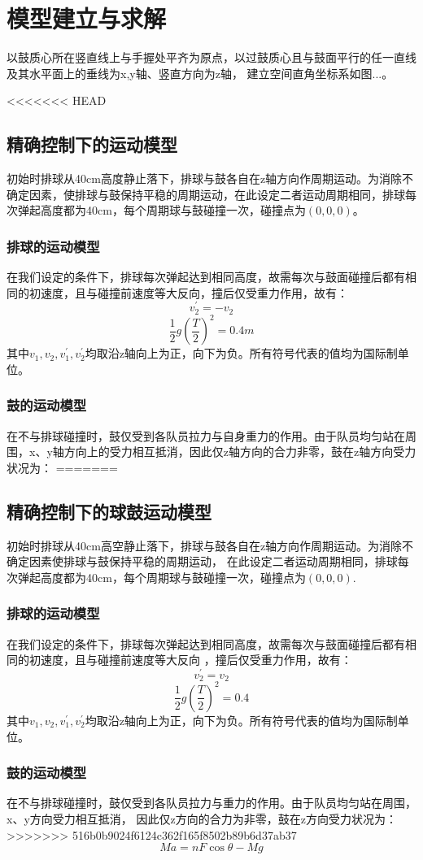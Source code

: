 \documentclass[withoutpreface,bwprint]{cumcmthesis} %
\begin{document}
\section{模型建立与求解}
以鼓质心所在竖直线上与手握处平齐为原点，以过鼓质心且与鼓面平行的任一直线及其水平面上的垂线为x,y轴、竖直方向为z轴，
建立空间直角坐标系如图...。

<<<<<<< HEAD
\subsection{精确控制下的运动模型}
初始时排球从40cm高度静止落下，排球与鼓各自在z轴方向作周期运动。为消除不确定因素，使排球与鼓保持平稳的周期运动，在此设定二者运动周期相同，排球每次弹起高度都为40cm，每个周期球与鼓碰撞一次，碰撞点为$(0,0,0)$。
\subsubsection{排球的运动模型}
在我们设定的条件下，排球每次弹起达到相同高度，故需每次与鼓面碰撞后都有相同的初速度，且与碰撞前速度等大反向，撞后仅受重力作用，故有：$$v_2^{'}=-v_2$$ $$\frac{1}{2}g(\frac{T}{2})^2=0.4m$$
其中$v_1, v_2, v_1^{'}, v_2^{'}$均取沿z轴向上为正，向下为负。所有符号代表的值均为国际制单位。
\subsubsection{鼓的运动模型}
在不与排球碰撞时，鼓仅受到各队员拉力与自身重力的作用。由于队员均匀站在周围，x、y轴方向上的受力相互抵消，因此仅z轴方向的合力非零，鼓在z轴方向受力状况为：
=======
\subsection{精确控制下的球鼓运动模型}
初始时排球从40cm高空静止落下，排球与鼓各自在z轴方向作周期运动。为消除不确定因素使排球与鼓保持平稳的周期运动，
在此设定二者运动周期相同，排球每次弹起高度都为40cm，每个周期球与鼓碰撞一次，碰撞点为$(0,0,0)$.
\subsubsection{排球的运动模型}
在我们设定的条件下，排球每次弹起达到相同高度，故需每次与鼓面碰撞后都有相同的初速度，且与碰撞前速度等大反向
，撞后仅受重力作用，故有：$$v_2^{'}=v_2$$ $$\frac{1}{2}g(\frac{T}{2})^2=0.4$$
其中$v_1, v_2, v_1^{'}, v_2^{'}$均取沿z轴向上为正，向下为负。所有符号代表的值均为国际制单位。
\subsubsection{鼓的运动模型}
在不与排球碰撞时，鼓仅受到各队员拉力与重力的作用。由于队员均匀站在周围，x、y方向受力相互抵消，
因此仅z方向的合力为非零，鼓在z方向受力状况为：
>>>>>>> 516b0b9024f6124c362f165f8502b89b6d37ab37
$$Ma=nF\cos\theta-Mg$$
\end{document}

